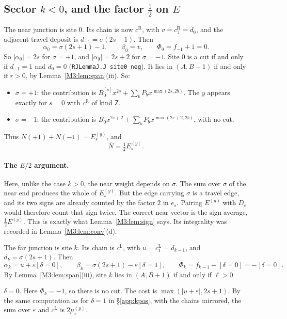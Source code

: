 \documentclass[11pt]{article}
\theoremstyle{plain}
\theoremstyle{definition}
\theoremstyle{remark}
\begin{document}
\subsection{Sector $k<0$, and the factor $\tfrac12$ on $E$}\label{app:kneg}

The near junction is site $0$. Its chain is now $c^{\mathrm R}$, with $v=c^{\mathrm R}_1=d_0$,
and the adjacent travel deposit is $d_{-1}=\sigma(2s+1)$. Then
\[
  \alpha_0=\sigma(2s+1)-1,\qquad\beta_0=v,\qquad\Phi_0=f_{-1}+1=0 .
\]
So $|\alpha_0|=2s$ for $\sigma=+1$, and $|\alpha_0|=2s+2$ for $\sigma=-1$. Site $0$ is a cut
if and only if $d_{-1}=1$ and $d_0=0$ (\texttt{RJLemmaJ.J\_site0\_neg}). It lies in
$(A,B+1)$ if and only if $r>0$, by Lemma~\ref{M3:lem:span}(iii). So:
\begin{itemize}
\item $\sigma=+1$: the contribution is $B_0^{[s]}x^{2s}+\sum_bP_bx^{\max(2s,2b)}$. The $y$
  appears exactly for $s=0$ with $c^{\mathrm R}$ of kind $\mathsf Z$.
\item $\sigma=-1$: the contribution is $B_0x^{2s+2}+\sum_bP_bx^{\max(2s+2,2b)}$, with no cut.
\end{itemize}
Thus $N(+1)+N(-1)=E^{(y)}_s$, and
\begin{equation}\label{eq:app-k-near}
  \overline N=\tfrac12E^{(y)}_s .
\end{equation}

\paragraph{The $E/2$ argument.}
Here, unlike the case $k>0$, the near weight depends on $\sigma$. The sum over $\sigma$ of
the near end produces the whole of $E^{(y)}_s$. But the edge carrying $\sigma$ is a travel
edge, and its two signs are already counted by the factor $2$ in $e_s$. Pairing
$E^{(y)}$ with $D_e$ would therefore count that sign twice. The correct near vector is the
sign average, $\tfrac12E^{(y)}$. This is exactly what Lemma~\ref{M3:lem:sign} says. Its
integrality was recorded in Lemma~\ref{M3:lem:conv}(d).

The far junction is site $k$. Its chain is $c^{\mathrm L}$, with $u=c^{\mathrm L}_1=d_{k-1}$,
and $d_k=\sigma(2s+1)$. Then
\[
  \alpha_k=u+\varepsilon[\delta=0],\qquad\beta_k=\sigma(2s+1)-\varepsilon[\delta=1],\qquad
  \Phi_k=f_{k-1}-[\delta=0]=-[\delta=0].
\]
By Lemma~\ref{M3:lem:span}(iii), site $k$ lies in $(A,B+1)$ if and only if $\ell>0$.

\emph{$\delta=0$.} Here $\Phi_k=-1$, so there is no cut. The cost is
$\max(|u+\varepsilon|,2s+1)$. By the same computation as for $\delta=1$ in \S\ref{app:kpos},
with the chains mirrored, the sum over $\varepsilon$ and $c^{\mathrm L}$ is $2\mu^{(y)}_s$.
\end{document}
